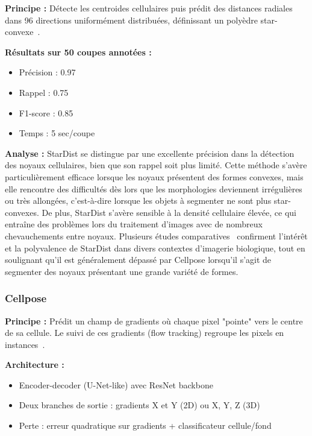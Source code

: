 \textbf{Principe :}
Détecte les centroides cellulaires puis prédit des distances radiales dans 96 directions uniformément distribuées, définissant un polyèdre star-convexe~\cite{Schmidt2018}.

\textbf{Résultats sur 50 coupes annotées :}
\begin{itemize}
    \item Précision : 0.97
    \item Rappel : 0.75
    \item F1-score : 0.85
    \item Temps : 5 sec/coupe
\end{itemize}

\textbf{Analyse :}
StarDist se distingue par une excellente précision dans la détection des noyaux cellulaires, bien que son rappel soit plus limité. Cette méthode s’avère particulièrement efficace lorsque les noyaux présentent des formes convexes, mais elle rencontre des difficultés dès lors que les morphologies deviennent irrégulières ou très allongées, c’est-à-dire lorsque les objets à segmenter ne sont plus star-convexes. De plus, StarDist s’avère sensible à la densité cellulaire élevée, ce qui entraîne des problèmes lors du traitement d’images avec de nombreux chevauchements entre noyaux. Plusieurs études comparatives~\cite{Weigert2022,Kleinberg2022} confirment l’intérêt et la polyvalence de StarDist dans divers contextes d’imagerie biologique, tout en soulignant qu’il est généralement dépassé par Cellpose lorsqu’il s’agit de segmenter des noyaux présentant une grande variété de formes.

\subsubsection{Cellpose}

\textbf{Principe :}
Prédit un champ de gradients où chaque pixel "pointe" vers le centre de sa cellule. Le suivi de ces gradients (flow tracking) regroupe les pixels en instances~\cite{Stringer2021}.

\textbf{Architecture :}
\begin{itemize}
    \item Encoder-decoder (U-Net-like) avec ResNet backbone
    \item Deux branches de sortie : gradients X et Y (2D) ou X, Y, Z (3D)
    \item Perte : erreur quadratique sur gradients + classificateur cellule/fond
\end{itemize}

